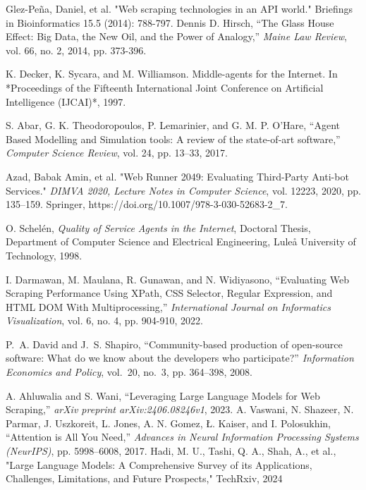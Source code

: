\documentclass[english,master]{unibg}
\begin{document}
\begin{thebibliography}{1}
 Glez-Peña, Daniel, et al. "Web scraping technologies in an API world." Briefings in Bioinformatics 15.5 (2014): 788-797.
Dennis D. Hirsch, ``The Glass House Effect: Big Data, the New Oil, and the Power of Analogy,'' \textit{Maine Law Review}, vol. 66, no. 2, 2014, pp. 373-396.

K. Decker, K. Sycara, and M. Williamson. Middle-agents for the Internet. In *Proceedings of the Fifteenth International Joint Conference on Artificial Intelligence (IJCAI)*, 1997.

    S. Abar, G. K. Theodoropoulos, P. Lemarinier, and G. M. P. O’Hare, ``Agent Based Modelling and Simulation tools: A review of the state-of-art software,'' \emph{Computer Science Review}, vol. 24, pp. 13–33, 2017.

 Azad, Babak Amin, et al. "Web Runner 2049: Evaluating Third-Party Anti-bot Services." \textit{DIMVA 2020, Lecture Notes in Computer Science}, vol. 12223, 2020, pp. 135–159. Springer, https://doi.org/10.1007/978-3-030-52683-2\_7.

O. Schelén, \emph{Quality of Service Agents in the Internet}, Doctoral Thesis, Department of Computer Science and Electrical Engineering, Luleå University of Technology, 1998.

I. Darmawan, M. Maulana, R. Gunawan, and N. Widiyasono, ``Evaluating Web Scraping Performance Using XPath, CSS Selector, Regular Expression, and HTML DOM With Multiprocessing,'' \emph{International Journal on Informatics Visualization}, vol. 6, no. 4, pp. 904-910, 2022.

P.~A. David and J.~S. Shapiro, ``Community-based production of open-source software: What do we know about the developers who participate?'' \emph{Information Economics and Policy}, vol.~20, no.~3, pp. 364–398, 2008.

    A. Ahluwalia and S. Wani, ``Leveraging Large Language Models for Web Scraping,'' \emph{arXiv preprint arXiv:2406.08246v1}, 2023.
A. Vaswani, N. Shazeer, N. Parmar, J. Uszkoreit, L. Jones, A. N. Gomez, Ł. Kaiser, and I. Polosukhin, ``Attention is All You Need,'' \textit{Advances in Neural Information Processing Systems (NeurIPS)}, pp. 5998--6008, 2017.
  Hadi, M. U., Tashi, Q. A., Shah, A., et al., "Large Language Models: A Comprehensive Survey of its Applications, Challenges, Limitations, and Future Prospects," TechRxiv, 2024


\end{thebibliography}
\end{document}
